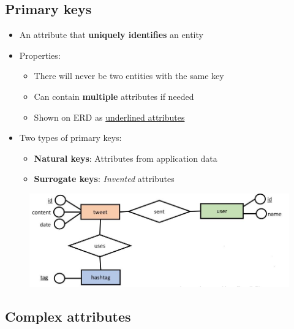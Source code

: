 \documentclass[conference]{IEEEtran}
\begin{document}
\subsection{Primary keys}

\begin{itemize}
    \item An attribute that \textbf{uniquely identifies} an entity
    \item Properties:
    \begin{itemize}
        \item There will never be two entities with the same key 
        \item Can contain \textbf{multiple} attributes if needed
        \item Shown on ERD as \underline{underlined attributes}
    \end{itemize}
    \item Two types of primary keys:
    \begin{itemize}
        \item \textbf{Natural keys}: Attributes from application data 
        \item \textbf{Surrogate keys}: \textit{Invented} attributes 
    \end{itemize}
\end{itemize}
\begin{figure} [h!]
    \centering
    \includegraphics[scale=0.4]{Ex2.JPG}
\end{figure}

\subsection{Complex attributes}
\end{document}
